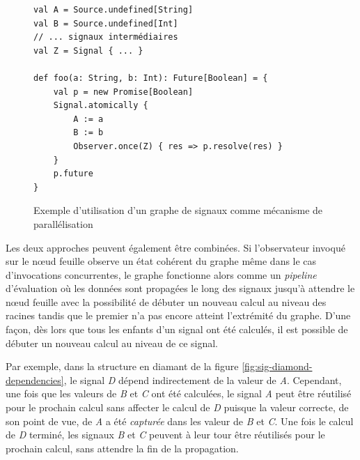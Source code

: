 \begin{figure}[h]
	\begin{lstlisting}
val A = Source.undefined[String]
val B = Source.undefined[Int]
// ... signaux intermédiaires
val Z = Signal { ... }

def foo(a: String, b: Int): Future[Boolean] = {
	val p = new Promise[Boolean]
	Signal.atomically {
		A := a
		B := b
		Observer.once(Z) { res => p.resolve(res) }
	}
	p.future
}
	\end{lstlisting}
	\caption{Exemple d'utilisation d'un graphe de signaux comme mécanisme de parallélisation}
	\label{fig:sig-pipeline}
\end{figure}

Les deux approches peuvent également être combinées. Si l'observateur invoqué sur le nœud feuille observe un état cohérent du graphe même dans le cas d'invocations concurrentes, le graphe fonctionne alors comme un \emph{pipeline} d'évaluation où les données sont propagées le long des signaux jusqu'à attendre le nœud feuille avec la possibilité de débuter un nouveau calcul au niveau des racines tandis que le premier n'a pas encore atteint l'extrémité du graphe. D'une façon, dès lors que tous les enfants d'un signal ont été calculés, il est possible de débuter un nouveau calcul au niveau de ce signal.

Par exemple, dans la structure en diamant de la figure \ref{fig:sig-diamond-dependencies}, le signal \emph{D} dépend indirectement de la valeur de \emph{A}. Cependant, une fois que les valeurs de \emph{B} et \emph{C} ont été calculées, le signal \emph{A} peut être réutilisé pour le prochain calcul sans affecter le calcul de \emph{D} puisque la valeur correcte, de son point de vue, de \emph{A} a été \emph{capturée} dans les valeur de \emph{B} et \emph{C}. Une fois le calcul de \emph{D} terminé, les signaux \emph{B} et \emph{C} peuvent à leur tour être réutilisés pour le prochain calcul, sans attendre la fin de la propagation.
